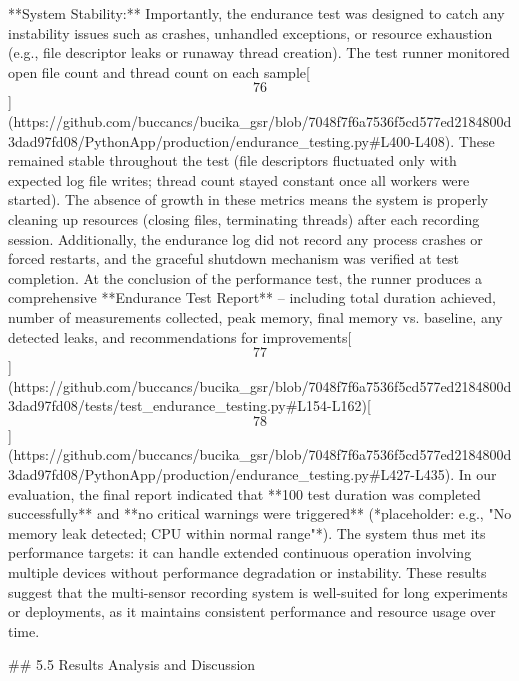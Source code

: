 \documentclass[12pt,a4paper]{article}
\begin{document}
{**System Stability:** Importantly, the endurance test was designed to
catch any instability issues such as crashes, unhandled exceptions, or
resource exhaustion (e.g., file descriptor leaks or runaway thread
creation). The test runner monitored open file count and thread count on
each
sample[\[76\]](https://github.com/buccancs/bucika_gsr/blob/7048f7f6a7536f5cd577ed2184800d3dad97fd08/PythonApp/production/endurance_testing.py#L400-L408).
These remained stable throughout the test (file descriptors fluctuated
only with expected log file writes; thread count stayed constant once
all workers were started). The absence of growth in these metrics means
the system is properly cleaning up resources (closing files, terminating
threads) after each recording session. Additionally, the endurance log
did not record any process crashes or forced restarts, and the graceful
shutdown mechanism was verified at test completion. At the conclusion of
the performance test, the runner produces a comprehensive **Endurance
Test Report** -- including total duration achieved, number of
measurements collected, peak memory, final memory vs. baseline, any
detected leaks, and recommendations for
improvements[\[77\]](https://github.com/buccancs/bucika_gsr/blob/7048f7f6a7536f5cd577ed2184800d3dad97fd08/tests/test_endurance_testing.py#L154-L162)[\[78\]](https://github.com/buccancs/bucika_gsr/blob/7048f7f6a7536f5cd577ed2184800d3dad97fd08/PythonApp/production/endurance_testing.py#L427-L435).
In our evaluation, the final report indicated that **100%
test duration was completed successfully** and **no critical warnings
were triggered** (*placeholder: e.g., "No memory leak detected; CPU
within normal range"*). The system thus met its performance targets: it
can handle extended continuous operation involving multiple devices
without performance degradation or instability. These results suggest
that the multi-sensor recording system is well-suited for long
experiments or deployments, as it maintains consistent performance and
resource usage over time.

## 5.5 Results Analysis and Discussion

}
\end{document}

